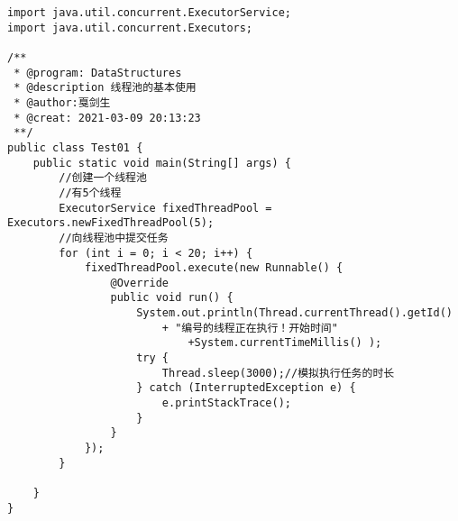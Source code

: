 \documentclass[a4paper]{report}
\begin{document}
\begin{Verbatim}[frame=single,numbersep=5pt,xleftmargin=1.5em,xrightmargin=1.5em]
import java.util.concurrent.ExecutorService;
import java.util.concurrent.Executors;

/**
 * @program: DataStructures
 * @description 线程池的基本使用
 * @author:戛剑生
 * @creat: 2021-03-09 20:13:23
 **/
public class Test01 {
    public static void main(String[] args) {
        //创建一个线程池
        //有5个线程
        ExecutorService fixedThreadPool = Executors.newFixedThreadPool(5);
        //向线程池中提交任务
        for (int i = 0; i < 20; i++) {
            fixedThreadPool.execute(new Runnable() {
                @Override
                public void run() {
                    System.out.println(Thread.currentThread().getId()
                        + "编号的线程正在执行！开始时间"
                            +System.currentTimeMillis() );
                    try {
                        Thread.sleep(3000);//模拟执行任务的时长
                    } catch (InterruptedException e) {
                        e.printStackTrace();
                    }
                }
            });
        }

    }
}\end{Verbatim}
\end{document}
